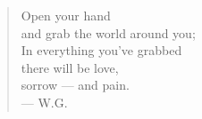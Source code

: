 \begin{verse}
Open your hand \\
and grab the world around you; \\
In everything you've grabbed \\
there will be love, \\
sorrow --- and pain. \\
--- W.G.
\end{verse}

